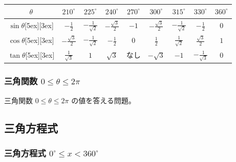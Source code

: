\documentclass[b5paper,10pt]{ltjsreport}
\newcounter{drillnum}
\newcommand{\resetdrill}{\setcounter{drillnum}{0}} %
\newcommand{\drilltitle}{問題項目}
\newcommand{\includedrill}[2]{ %
  \renewcommand{\drilltitle}{#1} %
  \pagestyle{drillstyle}
  
  \resetdrill
  \pagestyle{explanationstyle}
  \thispagestyle{explanationstyle}
}
\begin{document}
\begin{center}
\begin{tabular}{|c||c|c|c|c|c|c|c|c|}
 \hline
 $\theta$ & $210^{\circ}$ & $225^{\circ}$ & $240^{\circ}$ & $270^{\circ}$ & $300^{\circ}$ & $315^{\circ}$ & $330^{\circ}$ & $360^{\circ}$\\
 \hline \hline
 $\sin{\theta}$\raisebox{0ex}[5ex][3ex]{} & $\displaystyle -\frac{1}{2}$ & $\displaystyle -\frac{1}{\sqrt{2}}$ & $\displaystyle -\frac{\sqrt{3}}{2}$ & $-1$ & $\displaystyle -\frac{\sqrt{3}}{2}$ & $\displaystyle -\frac{1}{\sqrt{2}}$ & $\displaystyle -\frac{1}{2}$ & $0$ \\
 \hline
 $\cos{\theta}$\raisebox{0ex}[5ex][3ex]{} & $\displaystyle -\frac{\sqrt{3}}{2}$ & $\displaystyle -\frac{1}{\sqrt{2}}$ & $\displaystyle -\frac{1}{2}$ & $0$ & $\displaystyle \frac{1}{2}$ & $\displaystyle \frac{1}{\sqrt{2}}$ & $\displaystyle \frac{\sqrt{3}}{2}$ & $1$ \\
 \hline
 $\tan{\theta}$\raisebox{0ex}[5ex][3ex]{} & $\displaystyle \frac{1}{\sqrt{3}}$ & $1$ & $\displaystyle \sqrt{3}$ & なし & $\displaystyle -\sqrt{3}$ & $-1$ & $\displaystyle -\frac{1}{\sqrt{3}}$ & $0$ \\
 \hline
\end{tabular}
\end{center}

\vfill

\includedrill{三角関数$0^{\circ}\leq\theta\leq 360^{\circ}$}{code/triangle_function_0-360}




\subsubsection{三角関数 $0 \leq \theta \leq 2\pi$}

三角関数
$0 \leq \theta \leq 2\pi$
の値を答える問題。



\includedrill{三角関数$0 \leq\theta\leq 2\pi$}{code/triangle_function_0-2pi}



\subsection{三角方程式}

\subsubsection{三角方程式 $0^{\circ} \leq x < 360^{\circ}$}
\end{document}
